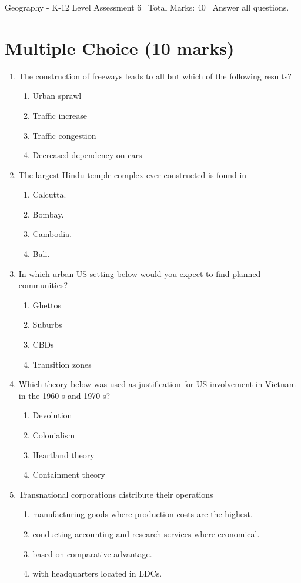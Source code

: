 \documentclass[12pt]{article}
\begin{document}
\begin{center}
Geography - K-12 Level Assessment 6 \
Total Marks: 40 \
Answer all questions.
\end{center}

\section*{Multiple Choice (10 marks)}
\begin{enumerate}[label=\arabic*.]
\item The construction of freeways leads to all but which of the following results?
\begin{enumerate}[label=(\alph*)]
    \item Urban sprawl
    \item Traffic increase
    \item Traffic congestion
    \item Decreased dependency on cars
\end{enumerate}
\item The largest Hindu temple complex ever constructed is found in
\begin{enumerate}[label=(\alph*)]
    \item Calcutta.
    \item Bombay.
    \item Cambodia.
    \item Bali.
\end{enumerate}
\item In which urban US setting below would you expect to find planned communities?
\begin{enumerate}[label=(\alph*)]
    \item Ghettos
    \item Suburbs
    \item CBDs
    \item Transition zones
\end{enumerate}
\item Which theory below was used as justification for US involvement in Vietnam in the 1960 s and 1970 s?
\begin{enumerate}[label=(\alph*)]
    \item Devolution
    \item Colonialism
    \item Heartland theory
    \item Containment theory
\end{enumerate}
\item Transnational corporations distribute their operations
\begin{enumerate}[label=(\alph*)]
    \item manufacturing goods where production costs are the highest.
    \item conducting accounting and research services where economical.
    \item based on comparative advantage.
    \item with headquarters located in LDCs.
\end{enumerate}
\end{enumerate}
\end{document}
